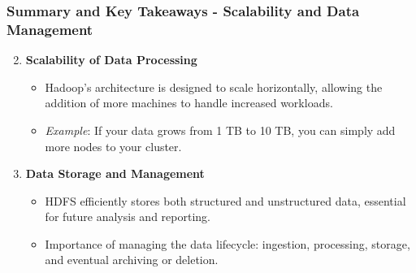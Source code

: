 \documentclass[aspectratio=169]{beamer}
\begin{document}
\begin{frame}[fragile]
    \frametitle{Summary and Key Takeaways - Scalability and Data Management}

    \begin{enumerate}
        \setcounter{enumi}{1}
        \item \textbf{Scalability of Data Processing}
        \begin{itemize}
            \item Hadoop's architecture is designed to scale horizontally, allowing the addition of more machines to handle increased workloads.
            
            \item \textit{Example}: If your data grows from 1 TB to 10 TB, you can simply add more nodes to your cluster.
        \end{itemize}
        
        \item \textbf{Data Storage and Management}
        \begin{itemize}
            \item HDFS efficiently stores both structured and unstructured data, essential for future analysis and reporting.
            \item Importance of managing the data lifecycle: ingestion, processing, storage, and eventual archiving or deletion.
        \end{itemize}
    \end{enumerate}

\end{frame}
\end{document}
